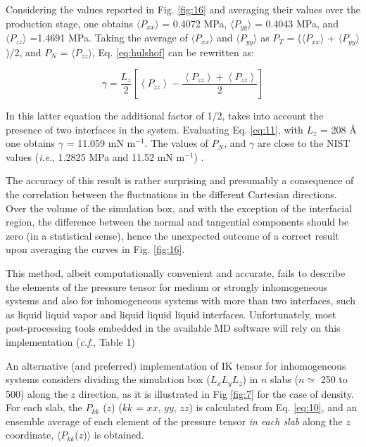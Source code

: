 \documentclass[9pt,tutorial]{livecoms}
\begin{document}
Considering the values reported in Fig. \ref{fig:16} and averaging their values
over the production stage, one obtains ${\langle}P_{xx}{\rangle}$
= 0.4072 MPa, ${\langle}P_{yy}{\rangle}$  = 0.4043 MPa, and
${\langle}P_{zz}{\rangle}$ =1.4691 MPa. Taking the average of
${\langle}P_{xx}{\rangle}$ and
${\langle}P_{yy}{\rangle}$ as $P_{T}$
= (${\langle}P_{xx}{\rangle}$
+ ${\langle}P_{yy}{\rangle}$)/2, and $P_{N}$
= ${\langle}P_{zz}{\rangle}$, Eq. \ref{eq:hulshof} can be rewritten as:

\begin{equation}
\gamma=\frac{L_{z}}{2}\left[\left\langle P_{zz}\right\rangle -\frac{\left\langle P_{zz}\right\rangle +\left\langle P_{zz}\right\rangle }{2}\right]
  \label{eq:11}
\end{equation}

In this latter equation the additional factor of 1/2, takes into account the
presence of  two interfaces in the system. Evaluating Eq. \ref{eq:11}, with
$L_{z}$ = 208 \AA{} one obtains ${\gamma}$ = 11.059 mN m$^{-1}$. The values of
$P_{N}$, and ${\gamma}$ are close to the NIST values (\textit{i.e}.,
1.2825 MPa and 11.52 mN m$^{-1}$) \citep{lemmon2013}.

The accuracy of this result
is rather surprising and presumably a consequence of the correlation between the
fluctuations in the different Cartesian directions. Over the volume of the simulation
box, and with the exception of the interfacial region, the difference between the
normal and tangential components should be zero (in a statistical sense), hence the unexpected
outcome of a correct result upon averaging the curves in Fig. \ref{fig:16}.

This method, albeit computationally convenient and accurate, fails to describe the elements of the pressure
tensor for medium or strongly inhomogeneous systems and also for inhomogeneous
systems with more than two interfaces, such as liquid \textendash{} liquid
\textendash{} vapor and liquid \textendash{} liquid \textendash{} liquid
interfaces. Unfortunately, most post-processing tools embedded in the available MD software
will rely on this implementation (\textit{c.f}., Table 1)

An alternative (and preferred) implementation of IK tensor for inhomogeneous
systems considers dividing the simulation box
($L_{x}L_{y}L_{z}$) in $n$ slabs
($n{\simeq}$ 250 to 500) along the $z$ direction, as it is
illustrated in Fig \ref{fig:7} for the case of density. For each slab, the
$P_{kk}$ ($z$) ($kk$ = $xx$, $yy$,
$zz$) is calculated from Eq. \ref{eq:10}, and an ensemble average of each element
of the pressure tensor \textit{in each slab} along the $z$ coordinate,
${\langle}P_{kk}$($z$)${\rangle}$ is obtained. 
\end{document}

